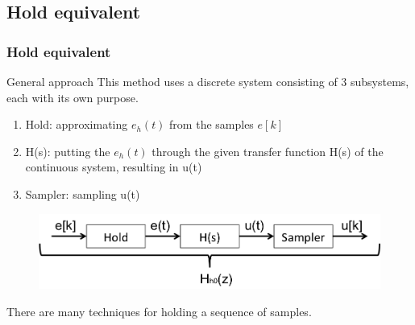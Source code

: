 \subsection{Hold equivalent}
\begin{frame}
	\frametitle{Hold equivalent}
	\begin{block}{General approach}
		This method uses a discrete system consisting of 3 subsystems, each with its own purpose. 
		\begin{enumerate}
			\item Hold: approximating $e_h(t)$ from the samples $e[k]$
			\item H(s): putting the $e_h(t)$ through the given transfer function H(s) of the continuous system, resulting in u(t)
			\item Sampler: sampling u(t) 
		\end{enumerate}
		\vspace{-1em}
		\begin{figure}
			\centering
			\includegraphics[width=0.8\linewidth]{hold_equivalent}
		\end{figure}
		\vspace{-1em}
		There are many techniques for holding a sequence of samples.
	\end{block}
\end{frame}

